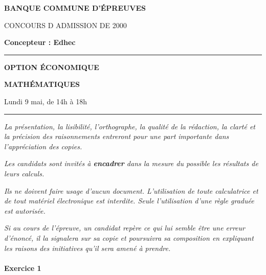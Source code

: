 \documentclass[11pt]{article}%
\begin{document}

\begin{center}
{\LARG\E\textbf{BANQUE COMMUNE D'ÉPREUVES}}



{\large \textsc{CONCOURS D ADMISSION DE 2000}}



{\large \textbf{Concepteur : Edhec}}



\rule{2.39cm}{0.05cm}



{\Large \textbf{OPTION ÉCONOMIQUE}}



{\Large \textbf{MATHÉMATIQUES }}



{\Large Lundi 9 mai, de 14h à 18h}



\rule{2.39cm}{0.05cm}
\end{center}

\textit{La présentation, la lisibilité, l'orthographe, la qualité
de la rédaction, la clarté et la précision des raisonnements
entreront pour une part importante dans l'appréciation des copies.}

\textit{Les candidats sont invités à \textbf{encadrer} dans la mesure
du possible les résultats de leurs calculs.}

\textit{Ils ne doivent faire usage d'aucun document. L'utilisation de
toute
calculatrice et de tout matériel électronique est interdite. Seule
l'utilisation d'une règle graduée est autorisée.}

\textit{Si au cours de l'épreuve, un candidat repère ce qui lui semble
être une erreur d'énoncé, il la signalera sur sa copie et
poursuivra sa composition en expliquant les raisons des initiatives
qu'il sera
amené à prendre.}

\vspace*{3cm}

\paragraph{ Exercice 1}
\end{document}
